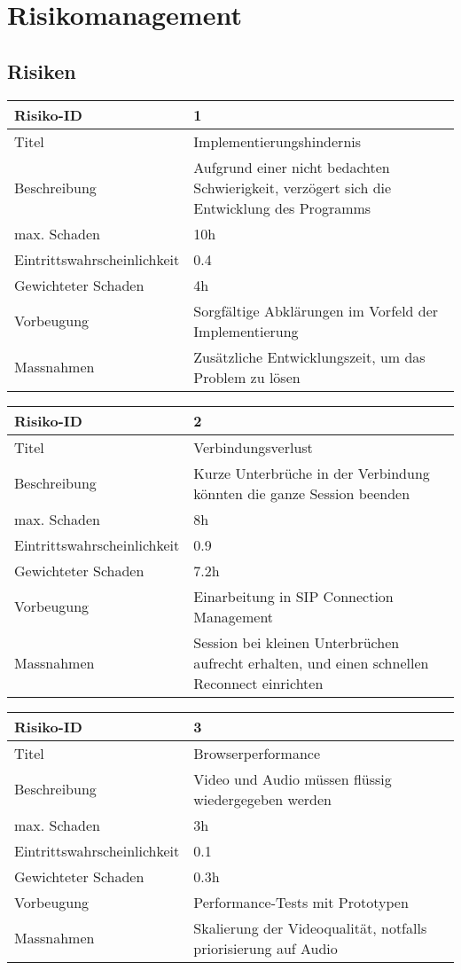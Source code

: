 \chapter{Risikomanagement}
\section{Risiken}

\begin{table}[h!]
	\centering
	\begin{tabular}{|p{} | p{} |}
	\hline	
	Risiko-ID & 1 \\
	\hline
	Titel & Implementierungshindernis \\
	Beschreibung & Aufgrund einer nicht bedachten Schwierigkeit, verzögert sich die Entwicklung des Programms \\
	max. Schaden	& 10h \\
	Eintrittswahrscheinlichkeit & 0.4 \\
	Gewichteter Schaden	& 4h \\
	Vorbeugung	& Sorgfältige Abklärungen im Vorfeld der Implementierung \\
	Massnahmen	& Zusätzliche Entwicklungszeit, um das Problem zu lösen \\
	\hline
	\end{tabular}
	
	\begin{tabular}{|p{} | p{} |}
	\hline	
	Risiko-ID & 2 \\
	\hline
	Titel & Verbindungsverlust \\
	Beschreibung & Kurze Unterbrüche in der Verbindung könnten die ganze Session beenden \\
	max. Schaden	& 8h \\
	Eintrittswahrscheinlichkeit & 0.9 \\
	Gewichteter Schaden	& 7.2h \\
	Vorbeugung	& Einarbeitung in SIP Connection Management \\
	Massnahmen	& Session bei kleinen Unterbrüchen aufrecht erhalten, und einen schnellen Reconnect einrichten \\
	\hline
	\end{tabular}
	
	\begin{tabular}{|p{} | p{} |}
	\hline	
	Risiko-ID & 3 \\
	\hline
	Titel & Browserperformance \\
	Beschreibung & Video und Audio müssen flüssig wiedergegeben werden\\
	max. Schaden	& 3h \\
	Eintrittswahrscheinlichkeit & 0.1 \\
	Gewichteter Schaden	& 0.3h \\
	Vorbeugung	& Performance-Tests mit Prototypen \\
	Massnahmen	& Skalierung der Videoqualität, notfalls priorisierung auf Audio \\
	\hline
	\end{tabular}
	

\end{table}
